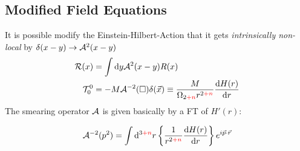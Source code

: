 \documentclass[xcolor=dvipsnames]{beamer}
\renewcommand{\d}{\mathrm{d}}
\newcommand{\dd}[2]{\frac{\mathrm{d} #1}{\mathrm{d} #2}}
\newcommand{\CA}{ {\cal A}}
\newcommand{\C}[1]{ {\cal #1}}
\newcommand*{\mathcolor}{}
\def\mathcolor#1#{\mathcoloraux{#1}}
\newcommand*{\mathcoloraux}[3]{%
  \protect\leavevmode
  \begingroup
    \color#1{#2}#3%
  \endgroup
}
\newcommand{\pn}{\mathcolor{red}{+ n}}
\begin{document}
\subsection{Modified Field Equations}
\begin{frame}
It is possible modify the Einstein-Hilbert-Action that it gets {\it intrinsically non-local} by \alert<1>{$\delta(x-y) \to \CA^2(x-y)$}
\pause
\begin{align*}
\C R(x) &= \int \d y \C A^2(x-y) R(x)
\\
\C T_0^0 &= -M \CA^{-2}(\square) \delta(\vec x)
\equiv
\frac{M}{\Omega_{2\pn}r^{2\pn}} \dd{H(r)}r
\end{align*}
\pause
The smearing operator $\CA$ is given basically
by a FT of $H'(r)$:

\begin{equation*}
\C A^{-2}(p^2) = \int \d^{3\pn} r
\left\{ \frac{1}{r^{2\pn}} \dd{H(r)}r \right\}
e^{i \vec p \cdot \vec r}
\end{equation*}

\end{frame}

\end{document}
